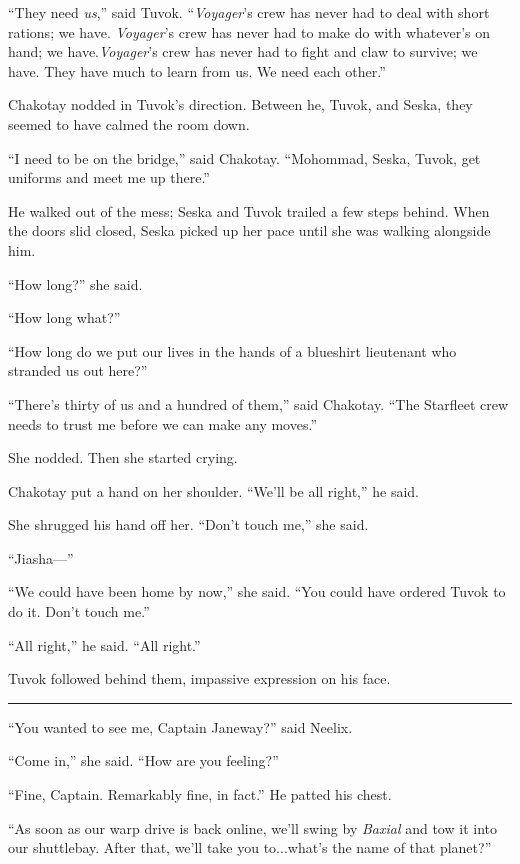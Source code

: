 \documentclass[twoside,letterpaper,12pt]{memoir}
\begin{document}
``They need \textit{us},” said Tuvok. ``\textit{Voyager}’s crew has never had to deal with short rations; we have. \textit{Voyager}’s crew has never had to make do with whatever’s on hand; we have.\textit{Voyager}’s crew has never had to fight and claw to survive; we have. They have much to learn from us. We need each other.” 

Chakotay nodded in Tuvok’s direction. Between he, Tuvok, and Seska, they seemed to have calmed the room down. 

``I need to be on the bridge,” said Chakotay. ``Mohommad, Seska, Tuvok, get uniforms and meet me up there.” 

He walked out of the mess; Seska and Tuvok trailed a few steps behind. When the doors slid closed, Seska picked up her pace until she was walking alongside him. 

``How long?” she said. 

``How long what?” 

``How long do we put our lives in the hands of a blueshirt lieutenant who stranded us out here?” 

``There’s thirty of us and a hundred of them,” said Chakotay. ``The Starfleet crew needs to trust me before we can make any moves.” 

She nodded. Then she started crying. 

Chakotay put a hand on her shoulder. ``We’ll be all right,” he said. 

She shrugged his hand off her. ``Don’t touch me,” she said. 

``Jiasha---” 

``We could have been home by now,” she said. ``You could have ordered Tuvok to do it. Don’t touch me.” 

``All right,” he said. ``All right.” 

Tuvok followed behind them, impassive expression on his face. 

\begin{center}\rule{3cm}{0.4 pt}\end{center} 

``You wanted to see me, Captain Janeway?” said Neelix. 

``Come in,” she said. ``How are you feeling?” 

``Fine, Captain. Remarkably fine, in fact.” He patted his chest. 

``As soon as our warp drive is back online, we’ll swing by \textit{Baxial} and tow it into our shuttlebay. After that, we’ll take you to...what’s the name of that planet?” 
\end{document}
